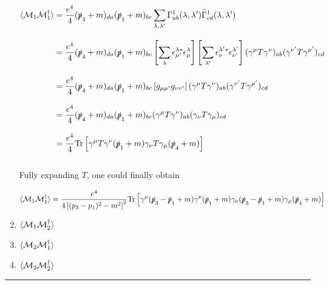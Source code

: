 \begin{solution}
\begin{enumerate}[label=(\alph*)]
    \begin{align*}
        \expval{\mathcal{M}_1\mathcal{M}_1^\dagger} &= \frac{e^4}{4}  (\pslash_4+m)_{da}  (\pslash_1+m)_{bc}  \sum_{\lambda,\lambda'} \Gamma^1_{ab}(\lambda,\lambda') \overbar{\Gamma}^1_{cd}(\lambda,\lambda') \\[0.12in]
        &= \frac{e^4}{4}  (\pslash_4+m)_{da}  (\pslash_1+m)_{bc} \left[ \sum_{\lambda}  \epsilon^{\lambda\ast}_{\mu'} \epsilon^\lambda_\mu \right] \left[ \sum_{\lambda'}  \epsilon^{\lambda' \ast}_\nu \epsilon^{\lambda'}_{\nu'} \right]  (\gamma^\mu T \gamma^\nu)_{ab} (\gamma^{\nu'} T \gamma^{\mu'})_{cd} \\[0.12in]
        &= \frac{e^4}{4}  (\pslash_4+m)_{da}  (\pslash_1+m)_{bc} \left[ g_{\mu\mu'} g_{\nu\nu'} \right](\gamma^\mu T \gamma^\nu)_{ab} (\gamma^{\nu'} T \gamma^{\mu'})_{cd}  \\[0.12in]
        &= \frac{e^4}{4}  (\pslash_4+m)_{da}  (\pslash_1+m)_{bc} (\gamma^\mu T \gamma^\nu)_{ab} (\gamma_{\nu} T \gamma_{\mu})_{cd}  \\[0.12in]
        &= \frac{e^4}{4} \tr \left[ \gamma^\mu T \gamma^\nu (\pslash_1+m) \gamma_{\nu} T \gamma_{\mu} (\pslash_4+m )\right] 
    \end{align*}\\
    Fully expanding $T$, one could finally obtain 

    \begin{align}
        \langle \mathcal{M}_1\mathcal{M}_1^\dagger \rangle = \frac{e^4}{4\left[(p_3-p_1)^2-m^2\right]^2} \text{Tr} \left[ \gamma^\mu (\slashed{p}_3-\slashed{p}_1 +m) \gamma^\nu (\slashed{p}_1 + m ) \gamma_\nu  (\slashed{p}_3-\slashed{p}_1 +m) \gamma_\mu (\slashed{p}_4 + m ) \right]
    \end{align}
    \item $\langle \mathcal{M}_1\mathcal{M}_2^\dagger \rangle $
    \item $\langle \mathcal{M}_2\mathcal{M}_1^\dagger \rangle $
    \item $\langle \mathcal{M}_2\mathcal{M}_2^\dagger \rangle $
\end{enumerate}
\end{solution}

\noindent\rule{7in}{1.5pt}


